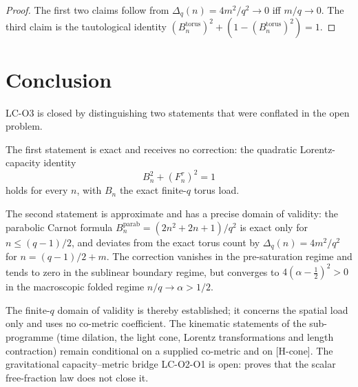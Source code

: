 \documentclass[12pt,a4paper]{article}
\theoremstyle{remark}
\begin{document}
  \begin{proof}
    The first two claims follow from $\Delta_q(n) = 4m^2/q^2 \to 0$ iff $m/q \to 0$.
    The third claim is the tautological identity $(B_n^{\mathrm{torus}})^2 +
    (1-(B_n^{\mathrm{torus}})^2) = 1$.
  \end{proof}

  \section{Conclusion}
  \label{sec:conclusion}

  LC-O3 is closed by distinguishing two statements that were conflated in the open
  problem.

  The first statement is exact and receives no correction: the quadratic
  Lorentz-capacity identity
  \[
    B_n^2 + (F^\tau_n)^2 = 1
  \]
  holds for every $n$, with $B_n$ the exact finite-$q$ torus load.

  The second statement is approximate and has a precise domain of validity: the parabolic
  Carnot formula $B_n^{\mathrm{parab}} = (2n^2+2n+1)/q^2$ is exact only for $n \leq
  (q-1)/2$, and deviates from the exact torus count by $\Delta_q(n) = 4m^2/q^2$ for
  $n = (q-1)/2 + m$.
  The correction vanishes in the pre-saturation regime and tends to zero in the sublinear boundary regime, but
  converges to $4(\alpha-\tfrac{1}{2})^2 > 0$ in the macroscopic folded regime
  $n/q \to \alpha > 1/2$.

  The finite-$q$ domain of validity is thereby established; it concerns the spatial load only and uses no
  co-metric coefficient.
  The kinematic statements of the sub-programme (time dilation, the light cone, Lorentz transformations and
  length contraction) remain conditional on a supplied co-metric and on [H-cone].
  The gravitational capacity--metric bridge LC-O2-O1 is open: \cite{Beau2026lco2o1} proves that the scalar
  free-fraction law does not close it.

  \newpage
  
  
\end{document}
